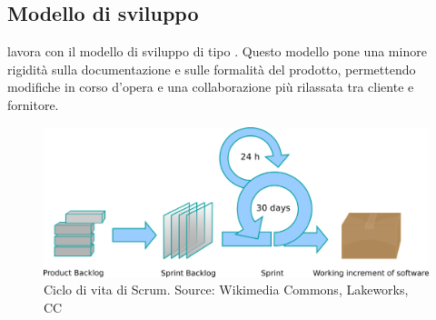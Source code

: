    \subsection{Modello di sviluppo}
   \nomeAzienda{} lavora con il modello di sviluppo  di tipo . Questo modello pone una minore rigidità sulla documentazione e sulle formalità del prodotto, permettendo modifiche in corso d'opera e una collaborazione più rilassata tra cliente e fornitore.
   
   \begin{figure}[htbp]
      \centering
      \includegraphics[width=14cm]{immagini/scrum-process}
      \caption{Ciclo di vita di Scrum. Source: Wikimedia Commons, Lakeworks, CC}
   \end{figure}
   

